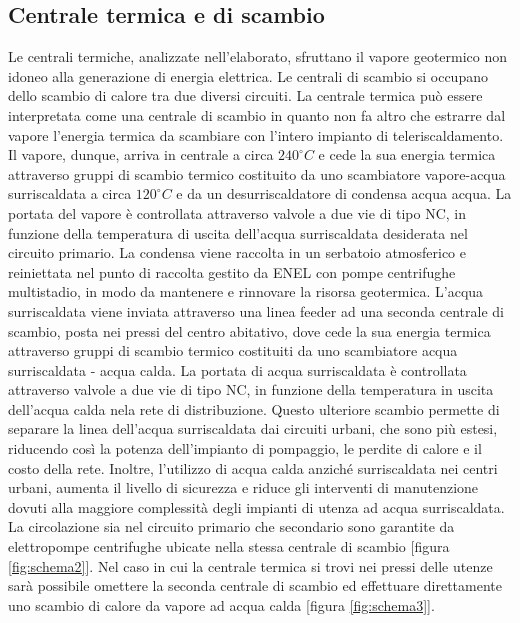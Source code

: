 \documentclass[laurea,oneside,11pt]{USiena_tesiLM}
\begin{document}
\subsection{Centrale termica e di scambio}
Le centrali termiche, analizzate nell'elaborato, sfruttano il vapore geotermico non idoneo alla generazione di energia elettrica. Le centrali di scambio si occupano dello scambio di calore tra due diversi circuiti. La centrale termica può essere interpretata come una centrale di scambio in quanto non fa altro che estrarre dal vapore l'energia termica da scambiare con l'intero impianto di teleriscaldamento. Il vapore, dunque, arriva in centrale a circa $240 ^{\circ}C$ e cede la sua energia termica attraverso gruppi di scambio termico costituito da uno scambiatore vapore-acqua surriscaldata a circa $120 ^{\circ}C$ e da un desurriscaldatore di condensa acqua acqua. La portata del vapore è controllata attraverso  valvole a due vie di tipo NC, in funzione della temperatura  di uscita dell'acqua surriscaldata desiderata nel circuito primario. La condensa viene raccolta in un serbatoio atmosferico e reiniettata nel punto di raccolta gestito da ENEL con pompe centrifughe multistadio, in modo da mantenere e rinnovare la risorsa geotermica. L'acqua surriscaldata viene inviata attraverso una linea feeder ad una seconda centrale di scambio, posta nei pressi del centro abitativo, dove cede la sua energia termica attraverso gruppi di scambio termico costituiti da uno scambiatore acqua surriscaldata - acqua calda. La portata di acqua surriscaldata è controllata attraverso valvole a due vie di tipo NC, in funzione della temperatura in uscita dell'acqua calda nela rete di distribuzione. Questo ulteriore scambio permette di separare la linea dell'acqua surriscaldata  dai circuiti urbani, che sono più estesi, riducendo così la potenza dell'impianto di pompaggio, le perdite di calore e il costo della rete. Inoltre, l'utilizzo di acqua calda anziché surriscaldata nei centri urbani, aumenta il livello di sicurezza e riduce gli interventi di manutenzione dovuti alla maggiore complessità degli impianti di utenza ad acqua surriscaldata. La circolazione sia nel circuito primario che secondario sono garantite da elettropompe centrifughe ubicate nella stessa centrale di scambio [figura \ref{fig:schema2}].
Nel caso in cui la centrale termica si trovi nei pressi delle utenze sarà possibile omettere la seconda centrale di scambio ed effettuare direttamente uno scambio di calore da vapore ad acqua calda [figura \ref{fig:schema3}].
\end{document}

